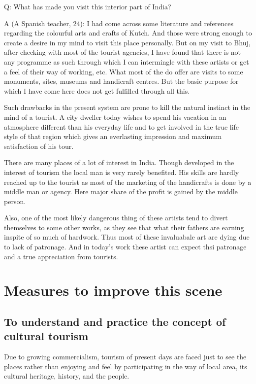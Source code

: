 Q: What has made you visit this interior part of India?

A (A Spanish teacher, 24): I had come across some literature and references regarding the colourful arts and crafts of Kutch. And those were strong enough to create a desire in my mind to visit this place personally. But on my visit to Bhuj, after checking with most of the tourist agencies, I have found that there is not any programme as such through which I can intermingle with these artists or get a feel of their way of working, etc. What most of the do offer are visits to some monuments, sites, museums and handicraft centres. But the basic purpose for which I have come here does not get fulfilled through all this.

Such drawbacks in the present system are prone to kill the natural instinct in the mind of a tourist. A city dweller today wishes to spend his vacation in an atmosphere different than his everyday life and to get involved in the true life style of that region which gives an everlasting impression and maximum satisfaction of his tour.

There are many places of a lot of interest in India. Though developed in the interest of tourism the local man is very rarely benefited. His skills are hardly reached up to the tourist as most of the marketing of the handicrafts is done by a middle man or agency. Here major share of the profit is gained by the middle person.

Also, one of the most likely dangerous thing of these artists tend to divert themselves to some other works, as they see that what their fathers are earning inspite of so much of hardwork. Thus most of these invaluabale art are dying due to lack of patronage. And in today's work these artist can expect thsi patronage and a true appreciation from tourists.


\section{Measures to improve this scene} %
\label{sec:measures}

\subsection{To understand and practice the concept of cultural tourism} %
\label{sub:concept_ct}

Due to growing commercialism, tourism of present days are faced just to see the places rather than enjoying and feel by participating in the way of local area, its cultural heritage, history, and the people.

